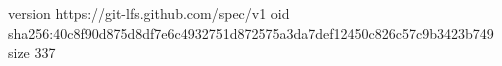version https://git-lfs.github.com/spec/v1
oid sha256:40c8f90d875d8df7e6c4932751d872575a3da7def12450c826c57c9b3423b749
size 337
